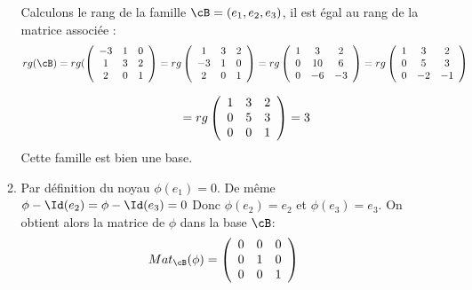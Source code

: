 \begin{correction}
\begin{enumerate}
\begin{enumerate}
Calculons le rang de la famille $\cB =(e_1, e_2, e_3)$, il est égal au rang de la matrice  associée : 
$$rg(\cB) = rg ( \left(\begin{array}{ccc}
-3 & 1 &0 \\
1 & 3 &2 \\
2 & 0 &1 
\end{array}\right)  = rg \left(\begin{array}{ccc}
1 & 3 &2 \\
-3 & 1 &0 \\
2 & 0 &1 
\end{array}\right)  = rg \left(\begin{array}{ccc}
1 & 3 &2 \\
0 & 10 &6 \\
0 & -6 &-3
\end{array}\right)=rg \left(\begin{array}{ccc}
1 & 3 &2 \\
0 & 5 &3 \\
0 & -2 &-1
\end{array}\right)  $$

$$\phantom{rg(\cB)} =rg \left(\begin{array}{ccc}
1 & 3 &2 \\
0 & 5 &3 \\
0 & 0 &1
\end{array}\right)  =3$$
Cette famille est bien une base. 

\item Par définition du noyau $\phi(e_1) = 0$. De même $\phi-\Id (e_2) = \phi-\Id (e_3) =0$ Donc 
$\phi(e_2)=e_2 $ et $\phi(e_3)= e_3$. 
On obtient alors la matrice de $\phi$ dans la base $\cB$:
$$Mat_{\cB} (\phi)  =\left(\begin{array}{ccc}
0 & 0&0 \\
0 & 1 &0 \\
0 & 0 &1
\end{array}\right) $$

\end{enumerate}
\end{enumerate}
\end{correction}